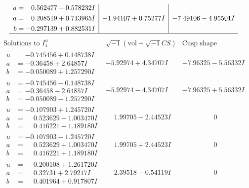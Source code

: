 \documentclass[1p]{elsarticle_modified}
\theoremstyle{definition}
\newcommand{\I}{\sqrt{-1}}
\begin{document}
$$\begin{array}{c|c|c}
\begin{aligned}
u &= \phantom{-}0.562477 - 0.578232 I \\
a &= \phantom{-}0.208519 + 0.713965 I \\
b &= -0.297139 + 0.882531 I\end{aligned}
 & -1.94107 + 0.75277 I & -7.49106 - 4.95501 I\\
 \hline 
 \end{array}$$\newpage$$\begin{array}{c|c|c}  
\text{Solutions to }I^u_{1}& \I (\text{vol} + \sqrt{-1}CS) & \text{Cusp shape}\\
 \hline 
\begin{aligned}
u &= -0.745456 + 0.148738 I \\
a &= -0.36458 + 2.64857 I \\
b &= -0.050089 + 1.257290 I\end{aligned}
 & -5.92974 + 4.34707 I & -7.96325 - 5.56332 I \\ \hline\begin{aligned}
u &= -0.745456 - 0.148738 I \\
a &= -0.36458 - 2.64857 I \\
b &= -0.050089 - 1.257290 I\end{aligned}
 & -5.92974 - 4.34707 I & -7.96325 + 5.56332 I \\ \hline\begin{aligned}
u &= -0.107903 + 1.245720 I \\
a &= \phantom{-}0.523629 - 1.003470 I \\
b &= \phantom{-}0.416221 - 1.189180 I\end{aligned}
 & \phantom{-}1.99705 - 2.44523 I & \phantom{-0.000000 } 0 \\ \hline\begin{aligned}
u &= -0.107903 - 1.245720 I \\
a &= \phantom{-}0.523629 + 1.003470 I \\
b &= \phantom{-}0.416221 + 1.189180 I\end{aligned}
 & \phantom{-}1.99705 + 2.44523 I & \phantom{-0.000000 } 0 \\ \hline\begin{aligned}
u &= \phantom{-}0.200108 + 1.261720 I \\
a &= \phantom{-}0.32731 + 2.79217 I \\
b &= \phantom{-}0.401964 + 0.917807 I\end{aligned}
 & \phantom{-}2.39518 - 0.54119 I & \phantom{-0.000000 } 0 \\ \hline\begin{aligned}

\end{aligned}
\end{array}$$
\end{document}
